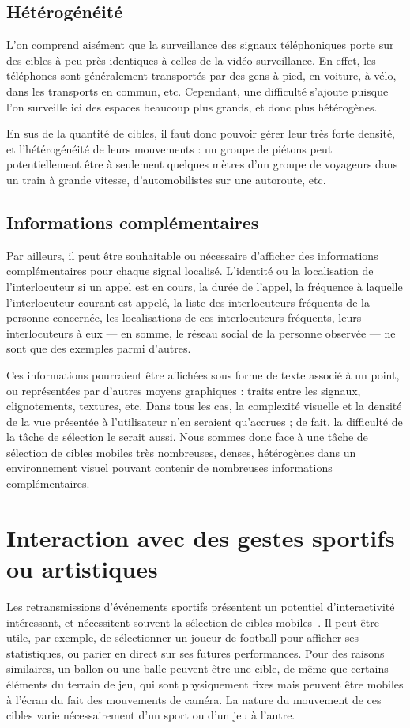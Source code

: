 	\subsection{Hétérogénéité}
	L'on comprend aisément que la surveillance des signaux téléphoniques porte sur des cibles à peu près identiques à celles de la vidéo-surveillance. En effet, les téléphones sont généralement transportés par des gens à pied, en voiture, à vélo, dans les transports en commun, etc. Cependant, une difficulté s'ajoute puisque l'on surveille ici des espaces beaucoup plus grands, et donc plus hétérogènes.
	
	En sus de la quantité de cibles, il faut donc pouvoir gérer leur très forte densité, et l'hétérogénéité de leurs mouvements : un groupe de piétons peut potentiellement être à seulement quelques mètres d'un groupe de voyageurs dans un train à grande vitesse, d'automobilistes sur une autoroute, etc.
	
	\subsection{Informations complémentaires}
	Par ailleurs, il peut être souhaitable ou nécessaire d'afficher des informations complémentaires pour chaque signal localisé. L'identité ou la localisation de l'interlocuteur si un appel est en cours, la durée de l'appel, la fréquence à laquelle l'interlocuteur courant est appelé, la liste des interlocuteurs fréquents de la personne concernée, les localisations de ces interlocuteurs fréquents, leurs interlocuteurs à eux — en somme, le réseau social de la personne observée — ne sont que des exemples parmi d'autres.
	
	Ces informations pourraient être affichées sous forme de texte associé à un point, ou représentées par d'autres moyens graphiques : traits entre les signaux, clignotements, textures, etc. Dans tous les cas, la complexité visuelle et la densité de la vue présentée à l'utilisateur n'en seraient qu'accrues ; de fait, la difficulté de la tâche de sélection le serait aussi. Nous sommes donc face à une tâche de sélection de cibles mobiles très nombreuses, denses, hétérogènes dans un environnement visuel pouvant contenir de nombreuses informations complémentaires.
	
	\section{Interaction avec des gestes sportifs ou artistiques}	
	Les retransmissions d'événements sportifs présentent un potentiel d'interactivité intéressant, et nécessitent souvent la sélection de cibles mobiles~\cite{ilich2010moving}. Il peut être utile, par exemple, de sélectionner un joueur de football pour afficher ses statistiques, ou parier en direct sur ses futures performances. Pour des raisons similaires, un ballon ou une balle peuvent être une cible, de même que certains éléments du terrain de jeu, qui sont physiquement fixes mais peuvent être mobiles à l'écran du fait des mouvements de caméra. La nature du mouvement de ces cibles varie nécessairement d'un sport ou d'un jeu à l'autre.
	
